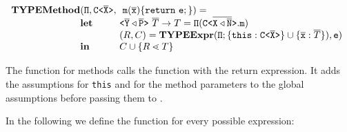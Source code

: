 \documentclass[a4paper,USenglish,cleveref, autoref, thm-restate, anonymous]{lipics-v2021}
\begin{document}
\begin{gather*}
\begin{array}{@{}l@{}l@{}l}
  \typeMethod & (\ensuremath{\mv{\Pi} }, \exptype{C}{\ol{X}},\ &\  \mathtt{m}(\ol{x})\{ \mathtt{ return }\ \texttt{e}; \}) =\\
              & \textbf{let} & \exptype{}{\ol{Y} \triangleleft \ol{P}}\ \overline{T} \to T  = \mv{\Pi} (\exptype{C}{\ol{X \triangleleft \ol{N}}}.\mv{m})
  \\
              & %
                                                                                              & ({R}, \consSet) =
                                                                                                \typeExpr(\mv\Pi ; \set{\mv{this} :
                                                                                                \exptype{C}{\ol{X}} } \cup \set{ \ol{x} : \overline{{T}} }), \texttt{e})\\
              & \mathbf{in}
                                                                                              & \consSet \cup \set{{R} \lessdot {T}}\\
\end{array}
\end{gather*}

The \typeMethod{} function for methods calls the \typeExpr{} function with the
return expression. It adds the assumptions for \texttt{this} and for the method parameters to the global assumptions before passing them to \typeExpr.

\smallskip

In the following we define the \typeExpr{} function for every possible expression:

\smallskip
\end{document}

